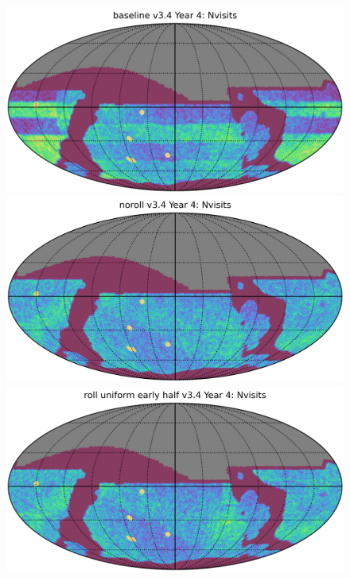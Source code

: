 


\begin{figure}
    \centering
    \includegraphics[width=0.32\linewidth]{figures/baseline_v3_4_Nvisits_Year_4_HEAL_SkyMap.png}
    \includegraphics[width=0.32\linewidth]{figures/noroll_v3_4_Nvisits_Year_4_HEAL_SkyMap.png}
    \includegraphics[width=0.32\linewidth]{figures/roll_uniform_early_half_v3_4_Nvisits_Year_4_HEAL_SkyMap.png}


\end{figure}
